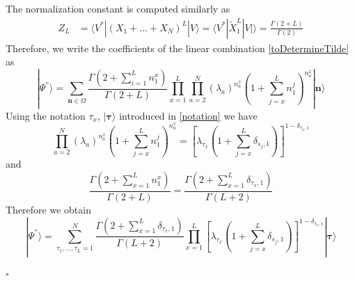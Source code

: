 \documentclass[10pt]{article}
\numberwithin{equation}{section}
\numberwithin{equation}{subsection}
\begin{document}
The normalization constant is computed similarly as 
\begin{align*}
	Z_{L}&=\langle V^{*}|(X_{1}+\ldots+X_{N})^{L}|V\rangle=\langle V^{*}|\widetilde{X}_{1}^{L}|V|\rangle=
	\frac{\Gamma(2+L)}{\Gamma(2)}
\end{align*}
Therefore, we write the coefficients of the linear combination \eqref{toDetermineTilde} as 
\begin{equation}\label{resulEsteady}
	|\Psi^{''}\rangle= \sum_{\bm{n}\in \Omega}\frac{\Gamma(2+\sum_{i=1}^{L}n_{1}^{x})}{\Gamma(2+L)}\prod_{x=1}^{L}\prod_{a=2}^{N}\left(\lambda_{a}\right)^{n_{a}^{x}}\left(1+\sum_{j=x}^{L}n_{1}^{j}\right)^{n_{a}^{x}}|\bm{n}\rangle
\end{equation}
Using the notation $\tau_{x}$, $|\bm{\tau}\rangle $ introduced in \eqref{notation} we have 
\begin{equation}
	\prod_{a=2}^{N}\left(\lambda_{a}\right)^{n_{a}^{x}}\left(1+\sum_{j=x}^{L}n_{1}^{j}\right)^{n_{a}^{x}}=\left[\lambda_{\tau_{x}}\left(1+\sum_{j=x}^{L}\delta_{s_{j},1}\right)\right]^{1-\delta_{\tau_{x},1}}
\end{equation}
and 
\begin{equation}
	\frac{\Gamma(2+\sum_{x=1}^{L}n_{1}^{x})}{\Gamma(2+L)}=\frac{\Gamma\left(2+\sum_{x=1}^{L}\delta_{\tau_{x},1}\right)}{\Gamma\left(L+2\right)}
\end{equation}
Therefore we obtain
\begin{equation}
|\Psi^{''}\rangle=\sum_{\tau_{1},\ldots,\tau_{L}=1}^{N}\frac{\Gamma\left(2+\sum_{x=1}^{L}\delta_{\tau_{x},1}\right)}{\Gamma\left(L+2\right)}\prod_{x=1}^{L}\left[\lambda_{\tau_{x}}\left(1+\sum_{j=x}^{L}\delta_{s_{j},1}\right)\right]^{1-\delta_{\tau_{x},1}}|\mathbf{\bm{\tau}}\rangle
\end{equation}
\begin{flushright}
$\square$
\end{flushright}
\end{document}
